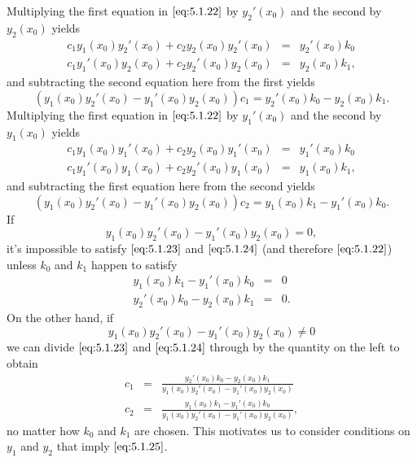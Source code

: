 \documentclass{ximera}
\begin{document}
Multiplying the first equation in $\eqref{eq:5.1.22}$ by $y_2'(x_0)$
and the second by $y_2(x_0)$ yields
\begin{eqnarray*}
c_1y_1(x_0)y_2'(x_0)+c_2y_2(x_0)y_2'(x_0)&=& y_2'(x_0)k_0\\
c_1y_1'(x_0)y_2(x_0)+c_2y_2'(x_0)y_2(x_0)&=& y_2(x_0)k_1,
\end{eqnarray*}
and subtracting the second equation here from the first yields
\begin{equation}\label{eq:5.1.23}
\left(y_1(x_0)y_2'(x_0)-y_1'(x_0)y_2(x_0)\right)c_1=
y_2'(x_0)k_0-y_2(x_0)k_1.
\end{equation}
Multiplying the first equation in $\eqref{eq:5.1.22}$ by $y_1'(x_0)$
and the second by $y_1(x_0)$ yields
\begin{eqnarray*}
c_1y_1(x_0)y_1'(x_0)+c_2y_2(x_0)y_1'(x_0)&=& y_1'(x_0)k_0\\
c_1y_1'(x_0)y_1(x_0)+c_2y_2'(x_0)y_1(x_0)&=& y_1(x_0)k_1,
\end{eqnarray*}
and subtracting the first equation here from the second yields
\begin{equation}\label{eq:5.1.24}
\left(y_1(x_0)y_2'(x_0)-y_1'(x_0)y_2(x_0)\right)c_2=
y_1(x_0)k_1-y_1'(x_0)k_0.
\end{equation}
If
$$
y_1(x_0)y_2'(x_0)-y_1'(x_0)y_2(x_0)=0,
$$
 it's impossible to satisfy $\eqref{eq:5.1.23}$ and $\eqref{eq:5.1.24}$
(and therefore $\eqref{eq:5.1.22}$)
unless $k_0$ and $k_1$ happen to satisfy
\begin{eqnarray*}
y_1(x_0)k_1-y_1'(x_0)k_0&=&0\\
y_2'(x_0)k_0-y_2(x_0)k_1&=&0.
\end{eqnarray*}
On the other hand, if
\begin{equation}\label{eq:5.1.25}
y_1(x_0)y_2'(x_0)-y_1'(x_0)y_2(x_0)\ne0
\end{equation}
 we can  divide $\eqref{eq:5.1.23}$ and $\eqref{eq:5.1.24}$ through by the
quantity on the left  to obtain
\begin{equation}\label{eq:5.1.26}
\begin{array}{rcl}
c_1&=&\frac{y_2'(x_0)k_0-y_2(x_0)k_1}
{y_1(x_0)y_2'(x_0)-y_1'(x_0)y_2(x_0)}\\
c_2&=&\frac{y_1(x_0)k_1-y_1'(x_0)k_0}
{y_1(x_0)y_2'(x_0)-y_1'(x_0)y_2(x_0)},
\end{array}
\end{equation}
no matter how $k_0$ and $k_1$ are chosen. This motivates us to
consider conditions on $y_1$ and $y_2$ that imply $\eqref{eq:5.1.25}$.
 
\end{document}
